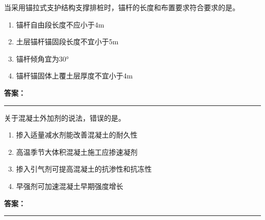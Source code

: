 \documentclass[UTF8,fontset=fandol,11pt]{ctexart}
\newcommand{\answerline}{\textcolor{answerred}{\rule{2.4cm}{0.7pt}}}
\begin{document}
\begin{quizbox}[title={乱序第 91 题｜第三章基坑工程}]

当采用锚拉式支护结构支撑排桩时，锚杆的长度和布置要求符合要求的是。\\

\begin{enumerate}[label=\Alph*.]

\item 锚杆自由段长度不应小于4m

\item 土层锚杆锚固段长度不宜小于5m

\item 锚杆倾角宜为30°

\item 锚杆锚固体上覆土层厚度不宜小于4m

\end{enumerate}

\textbf{\textcolor{answerred}{答案：}} \answerline

\end{quizbox}

\vspace{0.2em}

\begin{quizbox}[title={乱序第 92 题｜第四章混凝土结构工程}]

关于混凝土外加剂的说法，错误的是。\\

\begin{enumerate}[label=\Alph*.]

\item 掺入适量减水剂能改善混凝土的耐久性

\item 高温季节大体积混凝土施工应掺速凝剂

\item 掺入引气剂可提高混凝土的抗渗性和抗冻性

\item 早强剂可加速混凝土早期强度增长

\end{enumerate}

\textbf{\textcolor{answerred}{答案：}} \answerline

\end{quizbox}

\vspace{0.2em}
\end{document}
